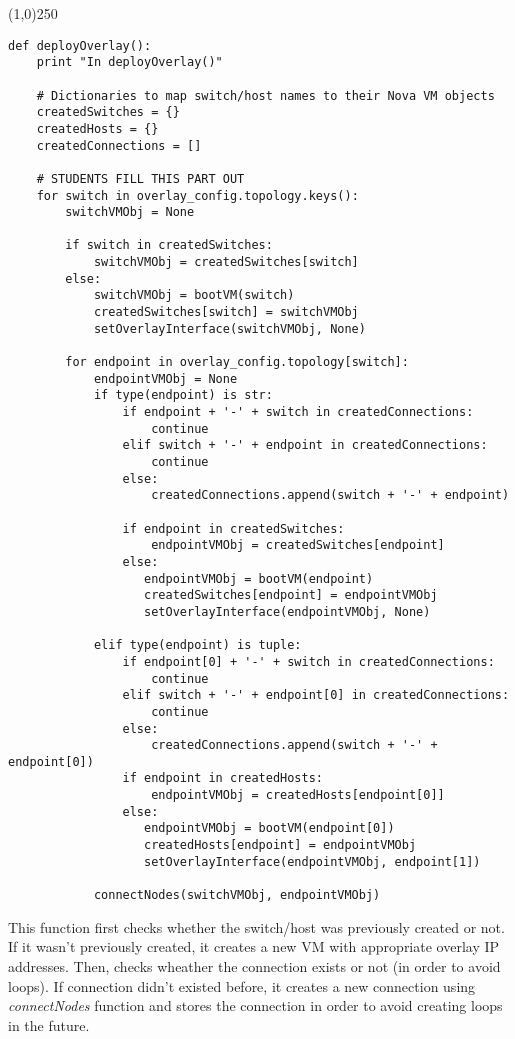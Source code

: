 \documentclass[12pt]{article}
\begin{document}
\begin{center}
	\line(1,0){250}
\end{center}
\begin{verbatim}
def deployOverlay():
    print "In deployOverlay()"

    # Dictionaries to map switch/host names to their Nova VM objects
    createdSwitches = {}
    createdHosts = {}
    createdConnections = []

    # STUDENTS FILL THIS PART OUT
    for switch in overlay_config.topology.keys():
        switchVMObj = None

        if switch in createdSwitches:
            switchVMObj = createdSwitches[switch]
        else:
            switchVMObj = bootVM(switch)
            createdSwitches[switch] = switchVMObj
            setOverlayInterface(switchVMObj, None)

        for endpoint in overlay_config.topology[switch]:
            endpointVMObj = None
            if type(endpoint) is str:
                if endpoint + '-' + switch in createdConnections:
                    continue
                elif switch + '-' + endpoint in createdConnections:
                    continue
                else:
                    createdConnections.append(switch + '-' + endpoint)

                if endpoint in createdSwitches:
                    endpointVMObj = createdSwitches[endpoint]
                else:
                   endpointVMObj = bootVM(endpoint)
                   createdSwitches[endpoint] = endpointVMObj
                   setOverlayInterface(endpointVMObj, None)

            elif type(endpoint) is tuple:
                if endpoint[0] + '-' + switch in createdConnections:
                    continue
                elif switch + '-' + endpoint[0] in createdConnections:
                    continue
                else:
                    createdConnections.append(switch + '-' + endpoint[0])
                if endpoint in createdHosts:
                    endpointVMObj = createdHosts[endpoint[0]]
                else:
                   endpointVMObj = bootVM(endpoint[0])
                   createdHosts[endpoint] = endpointVMObj
                   setOverlayInterface(endpointVMObj, endpoint[1])

            connectNodes(switchVMObj, endpointVMObj)
\end{verbatim}

This function first checks whether the switch/host was previously created or not. If it wasn't previously created, it creates a new VM with appropriate overlay IP addresses. Then, checks wheather the connection exists or not (in order to avoid loops). If connection didn't existed before, it creates a new connection using \textit{connectNodes} function and stores the connection in order to avoid creating loops in the future.
\end{document}
